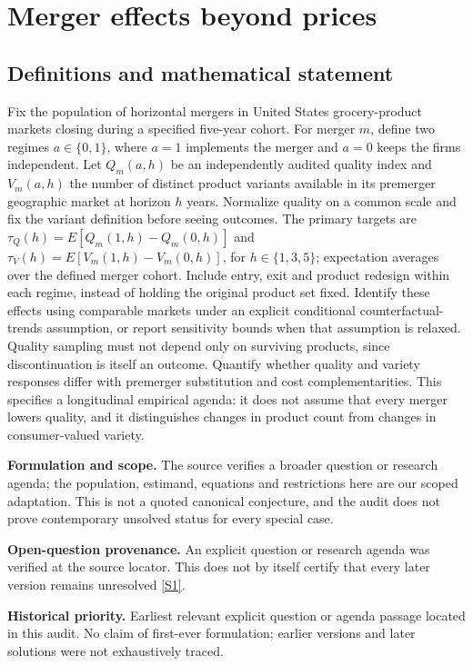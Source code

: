 \documentclass[11pt]{article}
\newcommand{\sref}[2]{\hyperlink{source:#1:#2}{[S#2]}}
\begin{document}
\section*{Merger effects beyond prices}\label{30007675}
\subsection{Definitions and mathematical statement}
Fix the population of horizontal mergers in United States grocery-product markets closing during a specified five-year cohort. For merger \(m\), define two regimes \(a\in\{0,1\}\), where \(a=1\) implements the merger and \(a=0\) keeps the firms independent. Let \(Q_m(a,h)\) be an independently audited quality index and \(V_m(a,h)\) the number of distinct product variants available in its premerger geographic market at horizon \(h\) years. Normalize quality on a common scale and fix the variant definition before seeing outcomes. The primary targets are \(\tau_Q(h)=E[Q_m(1,h)-Q_m(0,h)]\) and \(\tau_V(h)=E[V_m(1,h)-V_m(0,h)]\), for \(h\in\{1,3,5\}\); expectation averages over the defined merger cohort. Include entry, exit and product redesign within each regime, instead of holding the original product set fixed. Identify these effects using comparable markets under an explicit conditional counterfactual-trends assumption, or report sensitivity bounds when that assumption is relaxed. Quality sampling must not depend only on surviving products, since discontinuation is itself an outcome. Quantify whether quality and variety responses differ with premerger substitution and cost complementarities. This specifies a longitudinal empirical agenda: it does not assume that every merger lowers quality, and it distinguishes changes in product count from changes in consumer-valued variety.

\par\textbf{Formulation and scope.} The source verifies a broader question or research agenda; the population, estimand, equations and restrictions here are our scoped adaptation. This is not a quoted canonical conjecture, and the audit does not prove contemporary unsolved status for every special case.

\par\textbf{Open-question provenance.} An explicit question or research agenda was verified at the source locator. This does not by itself certify that every later version remains unresolved \sref{30007675}{1}.

\par\textbf{Historical priority.} Earliest relevant explicit question or agenda passage located in this audit. No claim of first-ever formulation; earlier versions and later solutions were not exhaustively traced.
\end{document}
